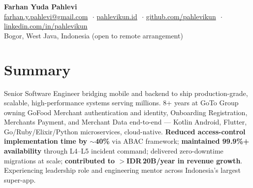 \documentclass[letterpaper,10pt]{article}
\begin{document}

\begin{center}
  {\Large\textbf{Farhan Yuda Pahlevi}}\\[3pt]
  \small
  \href{mailto:farhan.y.pahlevi@gmail.com}{farhan.y.pahlevi@gmail.com}
  $\,\cdot\,$\href{https://pahlevikun.id/}{pahlevikun.id}
  $\,\cdot\,$\href{https://github.com/pahlevikun}{github.com/pahlevikun}
  $\,\cdot\,$\href{https://linkedin.com/in/pahlevikun}{linkedin.com/in/pahlevikun}\\[1pt]
  Bogor, West Java, Indonesia \textnormal{(open to remote arrangement)}
\end{center}
\vspace{-6pt}

\section{Summary}
\small{
Senior Software Engineer bridging mobile and backend to ship production-grade, scalable,
high-performance systems serving millions. 8+ years at GoTo Group owning GoFood Merchant
authentication and identity, Onboarding Registration, Merchants Payment, and Merchant Data end-to-end ---
Kotlin Android, Flutter, Go/Ruby/Elixir/Python microservices, cloud-native.
\textbf{Reduced access-control implementation time by $\sim$40\%} via ABAC framework;
\textbf{maintained 99.9\%+ availability} through L4--L5 incident command; delivered
zero-downtime migrations at scale; \textbf{contributed to $>$IDR\,20B/year in revenue growth}.
Experiencing leadership role and engineering mentor across Indonesia's largest super-app.
}
\vspace{-2pt}

\end{document}
